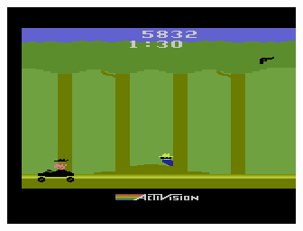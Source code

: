 \documentclass{beamer}
\begin{document}
\begin{frame}
\begin{columns}
    \begin{column}{0.5\textwidth}
      \includegraphics[scale=0.4]{../images/privateeye.png}
    \end{column}
  
  \end{columns}

\end{frame}
\end{document}
